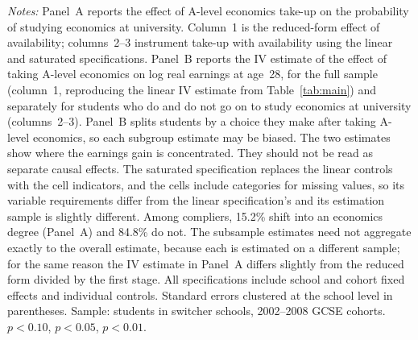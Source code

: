 \begin{table}[htbp]
\begin{tabular}{l ccc}
\bottomrule
\end{tabular}
\begin{minipage}{\textwidth}
\smallskip
\footnotesize
\textit{Notes:} Panel~A reports the effect of A-level economics take-up on the probability of studying economics at university. Column~1 is the reduced-form effect of availability; columns~2--3 instrument take-up with availability using the linear and saturated specifications. Panel~B reports the IV estimate of the effect of taking A-level economics on log real earnings at age~28, for the full sample (column~1, reproducing the linear IV estimate from Table~\ref{tab:main}) and separately for students who do and do not go on to study economics at university (columns~2--3). Panel~B splits students by a choice they make after taking A-level economics, so each subgroup estimate may be biased. The two estimates show where the earnings gain is concentrated. They should not be read as separate causal effects. The saturated specification replaces the linear controls with the cell indicators, and the cells include categories for missing values, so its variable requirements differ from the linear specification's and its estimation sample is slightly different. Among compliers, 15.2\% shift into an economics degree (Panel~A) and 84.8\% do not. The subsample estimates need not aggregate exactly to the overall estimate, because each is estimated on a different sample; for the same reason the IV estimate in Panel~A differs slightly from the reduced form divided by the first stage. All specifications include school and cohort fixed effects and individual controls. Standard errors clustered at the school level in parentheses. Sample: students in switcher schools, 2002--2008 GCSE cohorts. \sym{*} $p<0.10$, \sym{**} $p<0.05$, \sym{***} $p<0.01$.
\end{minipage}
\end{table}
